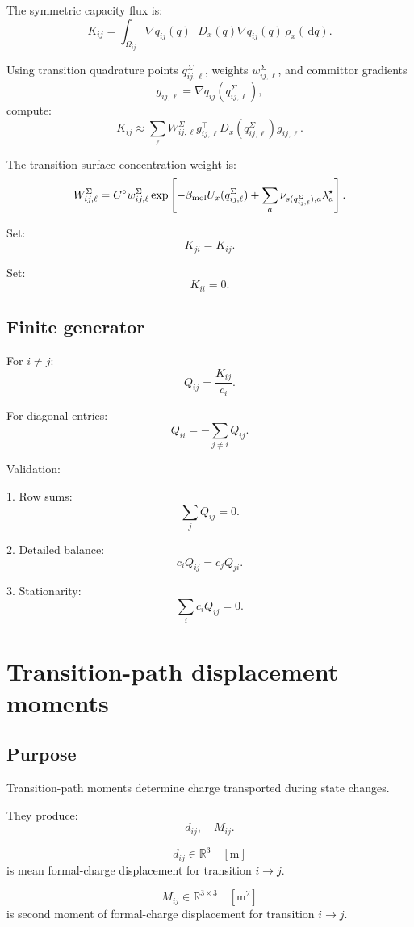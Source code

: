 \documentclass[11pt]{article}
\newcommand{\dd}{\,\mathrm d}
\newcommand{\R}{\mathbb R}
\begin{document}
  The symmetric capacity flux is:
  \[
  K_{ij}
  =
  \int_{\Omega_{ij}}
  \nabla q_{ij}(q)^\top
  D_x(q)
  \nabla q_{ij}(q)\,
  \rho_x(\dd q).
  \]

  Using transition quadrature points \(q_{ij,\ell}^{\Sigma}\), weights
  \(w_{ij,\ell}^{\Sigma}\), and committor gradients
  \[
  g_{ij,\ell}=\nabla q_{ij}(q_{ij,\ell}^{\Sigma}),
  \]
  compute:
  \[
  K_{ij}
  \approx
  \sum_{\ell}
  W_{ij,\ell}^{\Sigma}
  g_{ij,\ell}^{\top}
  D_x(q_{ij,\ell}^{\Sigma})
  g_{ij,\ell}.
  \]

  The transition-surface concentration weight is:
  \[
  W_{ij,\ell}^{\Sigma}
  =
  C^\circ
  w_{ij,\ell}^{\Sigma}
  \exp
  \left[
  -\beta_{\rm mol}U_x(q_{ij,\ell}^{\Sigma})
  +
  \sum_a\nu_{s(q_{ij,\ell}^{\Sigma}),a}\lambda_a^\star
  \right].
  \]

  Set:
  \[
  K_{ji}=K_{ij}.
  \]

  Set:
  \[
  K_{ii}=0.
  \]

  \subsection{Finite generator}

  For \(i\ne j\):
  \[
  Q_{ij}=\frac{K_{ij}}{c_i}.
  \]

  For diagonal entries:
  \[
  Q_{ii}=-\sum_{j\ne i}Q_{ij}.
  \]

  Validation:

  1. Row sums:
  \[
  \sum_j Q_{ij}=0.
  \]

  2. Detailed balance:
  \[
  c_iQ_{ij}=c_jQ_{ji}.
  \]

  3. Stationarity:
  \[
  \sum_i c_iQ_{ij}=0.
  \]

  \section{Transition-path displacement moments}

  \subsection{Purpose}

  Transition-path moments determine charge transported during state changes.

  They produce:
  \[
  d_{ij},\quad M_{ij}.
  \]

  \[
  d_{ij}\in\R^3
  \quad [\mathrm{m}]
  \]
  is mean formal-charge displacement for transition \(i\to j\).

  \[
  M_{ij}\in\R^{3\times3}
  \quad [\mathrm{m^2}]
  \]
  is second moment of formal-charge displacement for transition \(i\to j\).
\end{document}
